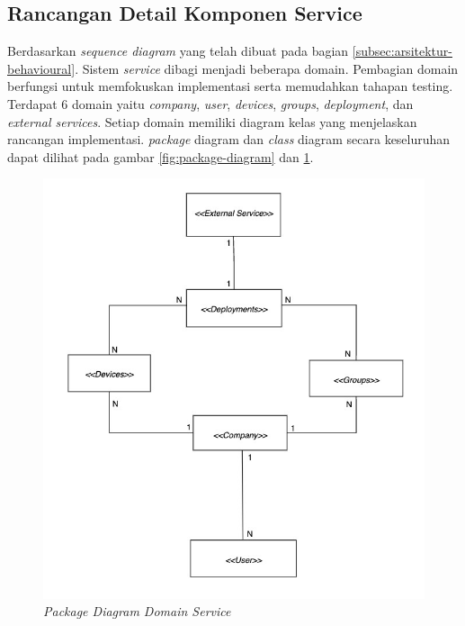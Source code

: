 \subsection{Rancangan Detail Komponen Service}
\label{sec:rancangan-service}

Berdasarkan \textit{sequence diagram} yang telah dibuat pada bagian \ref{subsec:arsitektur-behavioural}. Sistem \textit{service} dibagi menjadi beberapa domain. Pembagian domain berfungsi untuk memfokuskan implementasi serta memudahkan tahapan testing. Terdapat 6 domain yaitu \textit{company}, \textit{user}, \textit{devices}, \textit{groups}, \textit{deployment}, dan \textit{external services}. Setiap domain memiliki diagram kelas yang menjelaskan rancangan implementasi. \textit{package} diagram dan \textit{class} diagram secara keseluruhan dapat dilihat pada gambar \ref{fig:package-diagram} dan \ref{fig:package-class-domain-diagram}.
\begin{figure}[ht]
  \centering
  \includegraphics[width=1\textwidth]{resources/chapter-3/class/class-diagram-overall.jpg}
  \caption{\textit{Package Diagram Domain Service}}
  \label{fig:package-class-domain-diagram}
\end{figure}

